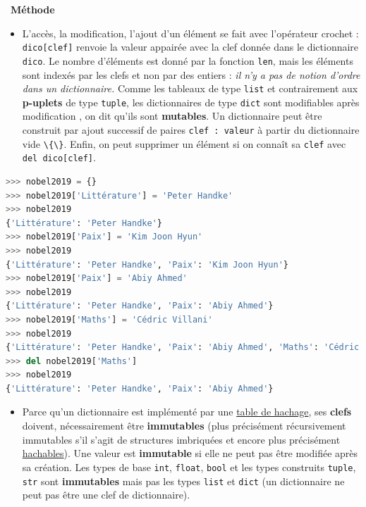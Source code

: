 \documentclass[
  11pt,
]{article}
\newcommand{\passthrough}[1]{#1}
\providecommand{\tightlist}{%
  \setlength{\itemsep}{0pt}\setlength{\parskip}{0pt}}
\newenvironment{methode}[1]
{\par \medskip    \noindent  
 \begin {bclogo}[arrondi =0.1,logo=\bcoutil, marge=4,noborder = true] {~\textbf{Méthode}   {\itshape #1} }  \par}
{
\end{bclogo}
 \par \bigskip }
\begin{document}
\begin{methode}{}

\begin{itemize}
\tightlist
\item
  L'accès, la modification, l'ajout d'un élément se fait avec
  l'opérateur crochet : \passthrough{\lstinline!dico[clef]!} renvoie la
  valeur appairée avec la clef donnée dans le dictionnaire
  \passthrough{\lstinline!dico!}. Le nombre d'éléments est donné par la
  fonction \passthrough{\lstinline!len!}, mais les éléments sont indexés
  par les clefs et non par des entiers : \emph{il n'y a pas de notion
  d'ordre dans un dictionnaire.} Comme les tableaux de type
  \passthrough{\lstinline!list!} et contrairement aux \textbf{p-uplets}
  de type \passthrough{\lstinline!tuple!}, les dictionnaires de type
  \passthrough{\lstinline!dict!} sont modifiables après modification ,
  on dit qu'ils sont \textbf{mutables}. Un dictionnaire peut être
  construit par ajout successif de paires
  \passthrough{\lstinline!clef : valeur!} à partir du dictionnaire vide
  \passthrough{\lstinline!\{\}!}. Enfin, on peut supprimer un élément si
  on connaît sa \passthrough{\lstinline!clef!} avec
  \passthrough{\lstinline!del dico[clef]!}.
\end{itemize}

\begin{lstlisting}[language=Python]
>>> nobel2019 = {}
>>> nobel2019['Littérature'] = 'Peter Handke'
>>> nobel2019
{'Littérature': 'Peter Handke'}
>>> nobel2019['Paix'] = 'Kim Joon Hyun'
>>> nobel2019
{'Littérature': 'Peter Handke', 'Paix': 'Kim Joon Hyun'}
>>> nobel2019['Paix'] = 'Abiy Ahmed'
>>> nobel2019
{'Littérature': 'Peter Handke', 'Paix': 'Abiy Ahmed'}
>>> nobel2019['Maths'] = 'Cédric Villani'
>>> nobel2019
{'Littérature': 'Peter Handke', 'Paix': 'Abiy Ahmed', 'Maths': 'Cédric Villani'}
>>> del nobel2019['Maths']
>>> nobel2019
{'Littérature': 'Peter Handke', 'Paix': 'Abiy Ahmed'}
\end{lstlisting}

\begin{itemize}
\tightlist
\item
  Parce qu'un dictionnaire est implémenté par une
  \href{https://fr.wikipedia.org/wiki/Table_de_hachage}{table de
  hachage}, ses \textbf{clefs} doivent, nécessairement être
  \textbf{immutables} (plus précisément récursivement immutables s'il
  s'agit de structures imbriquées et encore plus précisément
  \href{https://docs.python.org/3/glossary.html}{hachables}). Une valeur
  est \textbf{immutable} si elle ne peut pas être modifiée après sa
  création. Les types de base \passthrough{\lstinline!int!},
  \passthrough{\lstinline!float!}, \passthrough{\lstinline!bool!} et les
  types construits \passthrough{\lstinline!tuple!},
  \passthrough{\lstinline!str!} sont \textbf{immutables} mais pas les
  types \passthrough{\lstinline!list!} et \passthrough{\lstinline!dict!}
  (un dictionnaire ne peut pas être une clef de dictionnaire).
\end{itemize}


\end{methode}
\end{document}

